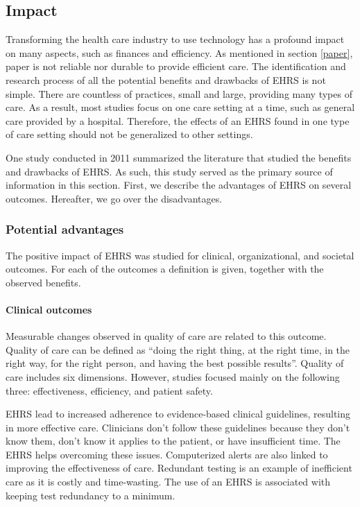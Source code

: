     \subsection{Impact}\label{impact_ehrs}

    Transforming the health care industry to use technology has a profound impact on many aspects, such as finances and efficiency. As mentioned in section \ref{paper}, paper is not reliable nor durable to provide efficient care. The identification and research process of all the potential benefits and drawbacks of EHRS is not simple. There are countless of practices, small and large, providing many types of care. As a result, most studies focus on one care setting at a time, such as general care provided by a hospital. Therefore, the effects of an EHRS found in one type of care setting should not be generalized to other settings. %

    One study conducted in 2011 summarized the literature that studied the benefits and drawbacks of EHRS\cite{Menachemi2011}. As such, this study served as the primary source of information in this section. First, we describe the advantages of EHRS on several outcomes. Hereafter, we go over the disadvantages.

        \subsubsection{Potential advantages}\label{ehrs_advantages}

        The positive impact of EHRS was studied for clinical, organizational, and societal outcomes. For each of the outcomes a definition is given, together with the observed benefits.

        \paragraph{Clinical outcomes} Measurable changes observed in quality of care are related to this outcome. Quality of care can be defined as ``doing the right thing, at the right time, in the right way, for the right person, and having the best possible results''\cite{AHRQ2001}. Quality of care includes six dimensions\cite{CTQC2001}. However, studies focused mainly on the following three: effectiveness, efficiency, and patient safety.

        EHRS lead to increased adherence to evidence-based clinical guidelines, resulting in more effective care. Clinicians don't follow these guidelines because they don't know them, don't know it applies to the patient, or have insufficient time. The EHRS helps overcoming these issues. Computerized alerts are also linked to improving the effectiveness of care. Redundant testing is an example of inefficient care as it is costly and time-wasting. The use of an EHRS is associated with keeping test redundancy to a minimum. 

